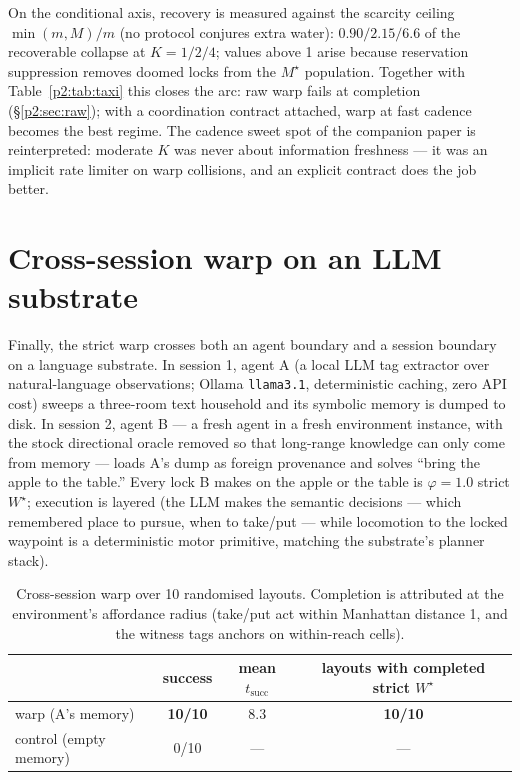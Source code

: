 \documentclass{article}
\newcommand{\method}[1]{\texttt{#1}}
\newcommand{\wstar}{W^{\star}}
\newcommand{\mstar}{M^{\star}}
\begin{document}
On the conditional axis, recovery is measured against the scarcity
ceiling $\min(m,M)/m$ (no protocol conjures extra water): $0.90 / 2.15
/ 6.6$ of the recoverable collapse at $K{=}1/2/4$; values above 1
arise because reservation suppression removes doomed locks from the
$\mstar$ population. Together with Table~\ref{p2:tab:taxi} this closes
the arc: raw warp fails at completion (\S\ref{p2:sec:raw}); with a
coordination contract attached, warp at fast cadence becomes the best
regime. The cadence sweet spot of the companion paper is
reinterpreted: moderate $K$ was never about information freshness ---
it was an implicit rate limiter on warp collisions, and an explicit
contract does the job better.

\section{Cross-session warp on an LLM substrate}
\label{p2:sec:llm}

Finally, the strict warp crosses both an agent boundary and a session
boundary on a language substrate. In session 1, agent A (a local
LLM tag extractor over natural-language observations; Ollama
\method{llama3.1}, deterministic caching, zero API cost) sweeps a
three-room text household and its symbolic memory is dumped to disk.
In session 2, agent B --- a fresh agent in a fresh environment
instance, with the stock directional oracle removed so that long-range
knowledge can only come from memory --- loads A's dump as foreign
provenance and solves ``bring the apple to the table.'' Every lock B
makes on the apple or the table is $\varphi{=}1.0$ strict $\wstar$;
execution is layered (the LLM makes the semantic decisions --- which
remembered place to pursue, when to take/put --- while locomotion to
the locked waypoint is a deterministic motor primitive, matching the
substrate's planner stack).

\begin{table}[h]
\centering
\caption{Cross-session warp over 10 randomised layouts. Completion is
attributed at the environment's affordance radius (take/put act within
Manhattan distance 1, and the witness tags anchors on within-reach
cells).}
\label{p2:tab:llm}
\small
\begin{tabular}{lccc}
\toprule
 & success & mean $t_{\text{succ}}$ & layouts with completed strict $\wstar$ \\
\midrule
warp (A's memory) & \textbf{10/10} & 8.3 & \textbf{10/10} \\
control (empty memory) & 0/10 & --- & --- \\
\bottomrule
\end{tabular}
\end{table}
\end{document}
